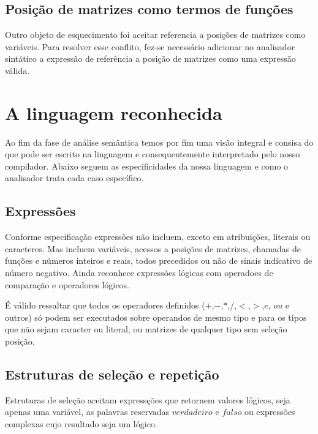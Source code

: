 \documentclass[a4paper,12pt]{report}
\begin{document}
\subsection{Posi\c{c}\~ao de matrizes como termos de fun\c{c}\~oes}

Outro objeto de esquecimento foi aceitar referencia a posi\c{c}\~oes de matrizes como 
vari\'aveis. Para resolver esse conflito, fez-se necess\'ario adicionar no analisador 
sint\'atico a express\~ao de refer\^encia a posi\c{c}\~ao de matrizes como uma express\~ao
v\'alida.

\section{A linguagem reconhecida}

Ao fim da fase de an\'alise sem\^antica temos por fim uma visão integral e consisa do que pode 
ser escrito na linguagem e consequentemente interpretado pelo nosso compilador. 
Abaixo seguem as especificidades da nossa linguagem e como o analisador
trata cada caso espec\'ifico.

\subsection{Express\~oes}

Conforme especifica\c{c}\~ao express\~oes n\~ao incluem, exceto em atribui\c{c}\~oes, literais 
ou caracteres. Mas incluem vari\'aveis, acessos a posi\c{c}\~oes de matrizes, chamadas de 
fun\c{c}\~oes e n\'umeros inteiros e reais, todos precedidos ou não de sinais indicativo de 
n\'umero negativo. Ainda reconhece express\~oes l\'ogicas com operadoes de comparação e 
operadores l\'ogicos.

\'E v\'alido ressaltar que todos os operadores definidos ($+$,$-$,$*$,$/$,$<$,$>$,$e$, $ou$ e 
outros) s\'o podem ser executados sobre operandos de mesmo tipo e para os tipos que não sejam
caracter ou literal, ou matrizes de qualquer tipo sem sele\c{c}\~ao posi\c{c}\~ao.

\subsection{Estruturas de sele\c{c}\~ao e repeti\c{c}\~ao}

Estruturas de sele\c{c}\~ao aceitam express\c{c}\~oes que retornem valores l\'ogicos, seja 
apenas uma vari\'avel, as palavras reservadas $verdadeiro$ e $falso$ ou express\~oes complexas
cujo resultado seja um l\'ogico.
\end{document}
